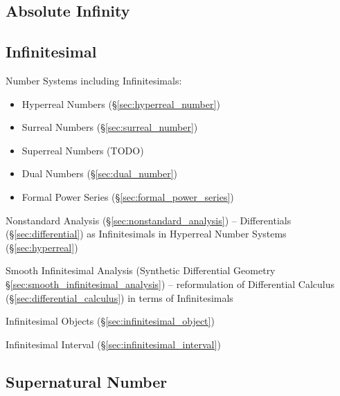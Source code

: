 \subsection{Absolute Infinity}\label{sec:absolute_infinity}

\subsection{Infinitesimal}\label{sec:infinitesimal}

Number Systems including Infinitesimals:
\begin{itemize}
  \item Hyperreal Numbers (\S\ref{sec:hyperreal_number})
  \item Surreal Numbers (\S\ref{sec:surreal_number})
  \item Superreal Numbers (TODO)
  \item Dual Numbers (\S\ref{sec:dual_number})
  \item Formal Power Series (\S\ref{sec:formal_power_series})
\end{itemize}

\fist Nonstandard Analysis (\S\ref{sec:nonstandard_analysis}) -- Differentials
(\S\ref{sec:differential}) as Infinitesimals in
Hyperreal Number Systems (\S\ref{sec:hyperreal})

\fist Smooth Infinitesimal Analysis (Synthetic Differential Geometry
\S\ref{sec:smooth_infinitesimal_analysis}) -- reformulation of Differential
Calculus (\S\ref{sec:differential_calculus}) in terms of Infinitesimals

\fist Infinitesimal Objects (\S\ref{sec:infinitesimal_object})

\fist Infinitesimal Interval (\S\ref{sec:infinitesimal_interval})



\subsection{Supernatural Number}\label{sec:supernatural_number}

